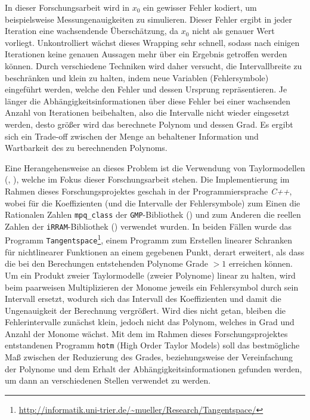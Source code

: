 In dieser Forschungsarbeit wird in $x_0$ ein gewisser Fehler kodiert, um beispielsweise Messungenauigkeiten zu simulieren. Dieser Fehler ergibt in jeder Iteration eine wachsendende Überschätzung, da $x_0$ nicht als genauer Wert vorliegt. Unkontrolliert wächst dieses Wrapping sehr schnell, sodass nach einigen Iterationen keine genauen Aussagen mehr über ein Ergebnis getroffen werden können. 
Durch verschiedene Techniken wird daher versucht, die Intervallbreite zu beschränken und klein zu halten, indem neue Variablen (Fehlersymbole) eingeführt werden, welche den Fehler und dessen Ursprung repräsentieren.
Je länger die Abhängigkeitsinformationen über diese Fehler bei einer wachsenden Anzahl von Iterationen beibehalten, also die Intervalle nicht wieder eingesetzt werden, desto größer wird das berechnete Polynom und dessen Grad. Es ergibt sich ein Trade-off zwischen der Menge an behaltener Information und Wartbarkeit des zu berechnenden Polynoms.
\par
Eine Herangehensweise an dieses Problem ist die Verwendung von Taylormodellen (\cite{makino2001}, \cite{DBLP:conf/macis/BrausseKM15}), welche im Fokus dieser Forschungsarbeit stehen. Die Implementierung im Rahmen dieses Forschungsprojektes geschah in der Programmiersprache \textit{C++}, wobei für die Koeffizienten (und die Intervalle der Fehlersymbole) zum Einen die Rationalen Zahlen \verb+mpq_class+ der \verb+GMP+-Bibliothek (\cite{gmp}) und zum Anderen die reellen Zahlen der \verb+iRRAM+-Bibliothek (\cite{iRRAM}) verwendet wurden. In beiden Fällen wurde das Programm \verb+Tangentspace+\footnote{\url{http://informatik.uni-trier.de/~mueller/Research/Tangentspace/}}, einem Programm zum Erstellen linearer Schranken für nichtlinearer Funktionen an einem gegebenen Punkt, derart erweitert, als dass die bei den Berechungen entstehenden Polynome Grade $> 1$ erreichen können. Um ein Produkt zweier Taylormodelle (zweier Polynome) linear zu halten, wird beim paarweisen Multiplizieren der Monome jeweils ein Fehlersymbol durch sein Intervall ersetzt, wodurch sich das Intervall des Koeffizienten und damit die Ungenauigkeit der Berechnung vergrößert. Wird dies nicht getan, bleiben die Fehlerintervalle zunächst klein, jedoch nicht das Polynom, welches in Grad und Anzahl der Monome wächst. 
Mit dem im Rahmen dieses Forschungsprojektes entstandenen Programm \verb+hotm+ (High Order Taylor Models) soll das bestmögliche Maß zwischen der Reduzierung des Grades, beziehungsweise der Vereinfachung der Polynome und dem Erhalt der Abhängigkeitsinformationen gefunden werden, um dann an verschiedenen Stellen verwendet zu werden.


